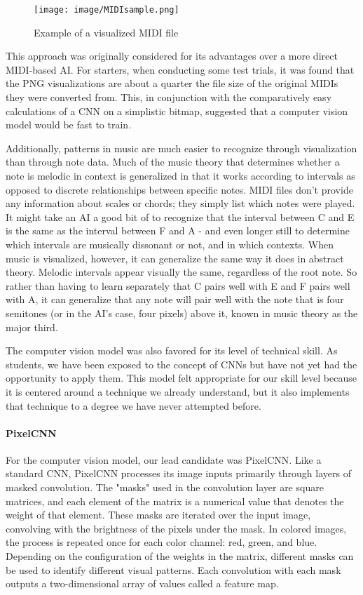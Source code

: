 \begin{figure}[h!]
  \centering
  \texttt{[image: image/MIDIsample.png]}
  \caption{Example of a visualized MIDI file}
  \label{fig:midi_sample}
\end{figure}

This approach was originally considered for its advantages over a more direct MIDI-based
AI. For starters, when conducting some test trials, it was found that the PNG
visualizations are about a quarter the file size of the original MIDIs they were converted
from. This, in conjunction with the comparatively easy calculations of a CNN on a
simplistic bitmap, suggested that a computer vision model would be fast to train.

Additionally, patterns in music are much easier to recognize through visualization than
through note data. Much of the music theory that determines whether a note is melodic in
context is generalized in that it works according to intervals as opposed to discrete
relationships between specific notes. MIDI files don't provide any information about
scales or chords; they simply list which notes were played. It might take an AI a good bit
of to recognize that the interval between C and E is the same as the interval between F
and A - and even longer still to determine which intervals are musically dissonant or not,
and in which contexts. When music is visualized, however, it can generalize the same way
it does in abstract theory. Melodic intervals appear visually the same, regardless of the
root note. So rather than having to learn separately that C pairs well with E and F pairs
well with A, it can generalize that any note will pair well with the note that is four
semitones (or in the AI's case, four pixels) above it, known in music theory as the major
third.

The computer vision model was also favored for its level of technical skill. As students,
we have been exposed to the concept of CNNs but have not yet had the opportunity to apply
them. This model felt appropriate for our skill level because it is centered around a
technique we already understand, but it also implements that technique to a degree we have
never attempted before.

\paragraph{PixelCNN}

For the computer vision model, our lead candidate was PixelCNN. Like a standard CNN,
PixelCNN processes its image inputs primarily through layers of masked convolution.
The "masks" used in the convolution layer are square matrices, and each element of the matrix
is a numerical value that denotes the weight of that element. These masks are iterated over the
input image, convolving with the brightness of the pixels under the mask. In colored images,
the process is repeated once for each color channel: red, green, and blue.\autocite{pixelCNN} Depending on the
configuration of the weights in the matrix, different masks can be used to identify different
visual patterns. Each convolution with each mask outputs a two-dimensional array of values
called a feature map.

